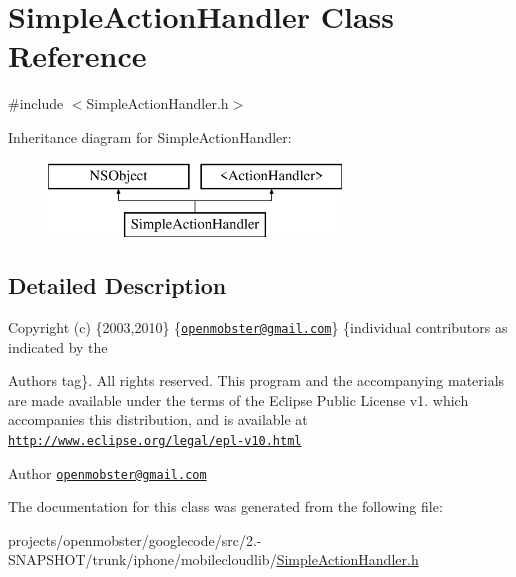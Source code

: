 \hypertarget{interface_simple_action_handler}{
\section{\-Simple\-Action\-Handler \-Class \-Reference}
\label{interface_simple_action_handler}
}


{\ttfamily \#include $<$\-Simple\-Action\-Handler.\-h$>$}

\-Inheritance diagram for \-Simple\-Action\-Handler\-:\begin{figure}[H]
\begin{center}
\leavevmode
\includegraphics[height=2.000000cm]{interface_simple_action_handler}
\end{center}
\end{figure}


\subsection{\-Detailed \-Description}
\-Copyright (c) \{2003,2010\} \{\href{mailto:openmobster@gmail.com}{\tt openmobster@gmail.\-com}\} \{individual contributors as indicated by the \begin{DoxyAuthor}{\-Authors}
tag\}. \-All rights reserved. \-This program and the accompanying materials are made available under the terms of the \-Eclipse \-Public \-License v1. which accompanies this distribution, and is available at \href{http://www.eclipse.org/legal/epl-v10.html}{\tt http\-://www.\-eclipse.\-org/legal/epl-\/v10.\-html}
\end{DoxyAuthor}
\begin{DoxyAuthor}{\-Author}
\href{mailto:openmobster@gmail.com}{\tt openmobster@gmail.\-com} 
\end{DoxyAuthor}


\-The documentation for this class was generated from the following file\-:\begin{DoxyCompactItemize}
\item 
projects/openmobster/googlecode/src/2.-\/\-S\-N\-A\-P\-S\-H\-O\-T/trunk/iphone/mobilecloudlib/\hyperlink{_simple_action_handler_8h}{\-Simple\-Action\-Handler.\-h}\end{DoxyCompactItemize}
